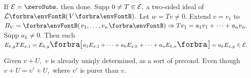 If $\mE=\zeroSubs,$ then done. Supp $0\neq T\in\mathcal{E},$ a two-sided ideal of $\Lm{V}.$ Let $w=Tv\neq 0.$\parSol{}
Extend $v=v_1$ to $B_V=\Par{v_1,\dots,v_n}\Rightarrow Tv_1=a_1v_1+\dots+a_nv_n.$ Supp $a_k\neq 0.$\parSol{}
Then each $E_{k,y}TE_{x,1}=E_{k,y}\Sbra{a_1E_{x,1}+\dots+a_kE_{x,k}+\dots+a_nE_{k,n}}=a_kE_{x,y}\in\mE.$\PfEnd
\SepLine

\ChEnd

\vfill{}

\vspace{6pt}

\BulletPointX{}\;\;Given $v+U,$ $v$ is already uniqly determined, as a sort of precond.\TextB{}
Even though $v+U=v'+U,$ where $v'$ is {\tgsl purer} than $v.$
\SepLine

\BulletPointX\NoteForSmall{[3.85]}\;\;
\SepLine\pagebreak

